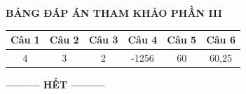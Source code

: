 \documentclass[12pt,a4paper]{article}
\begin{document}
\bigskip
\noindent\textbf{\large BẢNG ĐÁP ÁN THAM KHẢO PHẦN III}
\vspace{0.2cm}

\begin{center}
\begin{tabular}{|c|c|c|c|c|c|}
\hline
\textbf{Câu 1} & \textbf{Câu 2} & \textbf{Câu 3} & \textbf{Câu 4} & \textbf{Câu 5} & \textbf{Câu 6} \\
\hline
4 & 3 & 2 & -1256 & 60 & 60{,}25 \\
\hline
\end{tabular}
\end{center}

\begin{center}
\textbf{--------- HẾT ---------}
\end{center}
\end{document}
